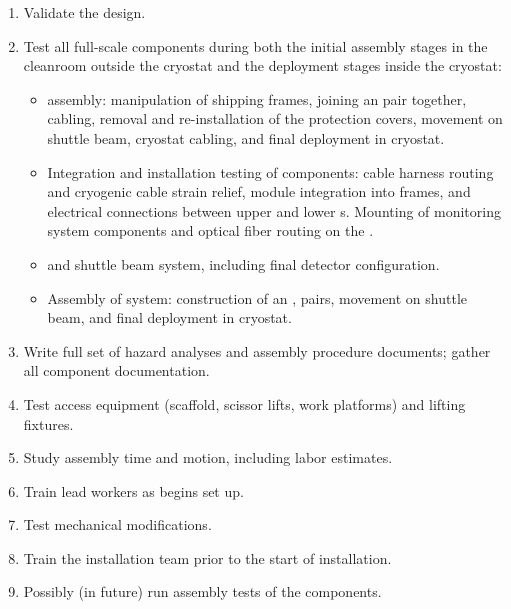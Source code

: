 \begin{enumerate}
\item Validate the  design. 
\item Test all full-scale  components during both the initial assembly stages in the cleanroom outside the cryostat and the deployment stages inside the cryostat:  
\begin{itemize}
    \item {}  assembly: manipulation of  shipping frames, joining an  pair together,  cabling, removal and re-installation of the  protection covers, movement on shuttle beam, cryostat cabling, and final deployment in cryostat. 
    \item Integration and installation testing of  components: cable harness routing and cryogenic cable strain relief, module integration into  frames, and electrical connections between upper and lower s.   Mounting of  monitoring system components and optical fiber routing on the . %
    \item {} and shuttle beam system, including final detector configuration.
    \item Assembly of  system: construction of an , %
    pairs, movement on shuttle beam, and final deployment in cryostat.
\end{itemize}
\item Write full set of hazard analyses and assembly procedure documents; %
gather all component documentation. 
\item Test access equipment (scaffold, scissor lifts, work platforms) and lifting fixtures. 
\item Study assembly time and motion, including labor estimates. %
\item Train lead workers as  begins set up.
\item Test mechanical modifications.
\item Train the installation team prior to the start of  installation. 
\item Possibly (in future) run assembly tests of the  components.
\end{enumerate}


